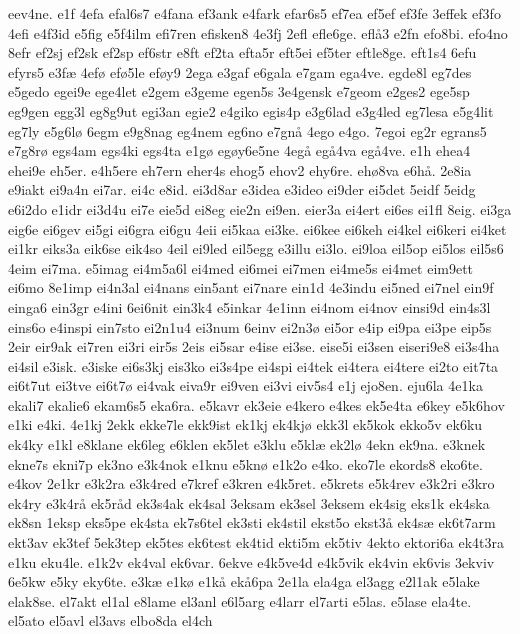 eev4ne.
e1f
4efa
efal6s7
e4fana
ef3ank
e4fark
efar6s5
ef7ea
ef5ef
ef3fe
3effek
ef3fo
4efi
e4f3id
e5fig
e5f4ilm
efi7ren
efisken8
4e3fj
2efl
efle6ge.
efl^^e53
e2fn
efo8bi.
efo4no
8efr
ef2sj
ef2sk
ef2sp
ef6str
e8ft
ef2ta
efta5r
eft5ei
ef5ter
eftle8ge.
eft1s4
6efu
efyrs5
e3f^^e6
4ef^^f8
ef^^f85le
ef^^f8y9
2ega
e3gaf
e6gala
e7gam
ega4ve.
egde8l
eg7des
e5gedo
egei9e
ege4let
e2gem
e3geme
egen5s
3e4gensk
e7geom
e2ges2
ege5sp
eg9gen
egg3l
eg8g9ut
egi3an
egie2
e4giko
egis4p
e3g6lad
e3g4led
eg7lesa
e5g4lit
eg7ly
e5g6l^^f8
6egm
e9g8nag
eg4nem
eg6no
e7gn^^e5
4ego
e4go.
7egoi
eg2r
egrans5
e7g8r^^f8
egs4am
egs4ki
egs4ta
e1g^^f8
eg^^f8y6e5ne
4eg^^e5
eg^^e54va
eg^^e54ve.
e1h
ehea4
ehei9e
eh5er.
e4h5ere
eh7ern
eher4s
ehog5
ehov2
ehy6re.
eh^^f88va
e6h^^e5.
2e8ia
e9iakt
ei9a4n
ei7ar.
ei4c
e8id.
ei3d8ar
e3idea
e3ideo
ei9der
ei5det
5eidf
5eidg
e6i2do
e1idr
ei3d4u
ei7e
eie5d
ei8eg
eie2n
ei9en.
eier3a
ei4ert
ei6es
ei1fl
8eig.
ei3ga
eig6e
ei6gev
ei5gi
ei6gra
ei6gu
4eii
ei5kaa
ei3ke.
ei6kee
ei6keh
ei4kel
ei6keri
ei4ket
ei1kr
eiks3a
eik6se
eik4so
4eil
ei9led
eil5egg
e3illu
ei3lo.
ei9loa
eil5op
ei5los
eil5s6
4eim
ei7ma.
e5imag
ei4m5a6l
ei4med
ei6mei
ei7men
ei4me5s
ei4met
eim9ett
ei6mo
8e1imp
ei4n3al
ei4nans
ein5ant
ei7nare
ein1d
4e3indu
ei5ned
ei7nel
ein9f
einga6
ein3gr
e4ini
6ei6nit
ein3k4
e5inkar
4e1inn
ei4nom
ei4nov
einsi9d
ein4s3l
eins6o
e4inspi
ein7sto
ei2n1u4
ei3num
6einv
ei2n3^^f8
ei5or
e4ip
ei9pa
ei3pe
eip5s
2eir
eir9ak
ei7ren
ei3ri
eir5s
2eis
ei5sar
e4ise
ei3se.
eise5i
ei3sen
eiseri9e8
ei3s4ha
ei4sil
e3isk.
e3iske
ei6s3kj
eis3ko
ei3s4pe
ei4spi
ei4tek
ei4tera
ei4tere
ei2to
eit7ta
ei6t7ut
ei3tve
ei6t7^^f8
ei4vak
eiva9r
ei9ven
ei3vi
eiv5s4
e1j
ejo8en.
eju6la
4e1ka
ekali7
ekalie6
ekam6s5
eka6ra.
e5kavr
ek3eie
e4kero
e4kes
ek5e4ta
e6key
e5k6hov
e1ki
e4ki.
4e1kj
2ekk
ekke7le
ekk9ist
ek1kj
ek4kj^^f8
ekk3l
ek5kok
ekko5v
ek6ku
ek4ky
e1kl
e8klane
ek6leg
e6klen
ek5let
e3klu
e5kl^^e6
ek2l^^f8
4ekn
ek9na.
e3knek
ekne7s
ekni7p
ek3no
e3k4nok
e1knu
e5kn^^f8
e1k2o
e4ko.
eko7le
ekords8
eko6te.
e4kov
2e1kr
e3k2ra
e3k4red
e7kref
e3kren
e4k5ret.
e5krets
e5k4rev
e3k2ri
e3kro
ek4ry
e3k4r^^e5
ek5r^^e5d
ek3s4ak
ek4sal
3eksam
ek3sel
3eksem
ek4sig
eks1k
ek4ska
ek8sn
1eksp
eks5pe
ek4sta
ek7s6tel
ek3sti
ek4stil
ekst5o
ekst3^^e5
ek4s^^e6
ek6t7arm
ekt3av
ek3tef
5ek3tep
ek5tes
ek6test
ek4tid
ekti5m
ek5tiv
4ekto
ektori6a
ek4t3ra
e1ku
eku4le.
e1k2v
ek4val
ek6var.
6ekve
e4k5ve4d
e4k5vik
ek4vin
ek6vis
3ekviv
6e5kw
e5ky
eky6te.
e3k^^e6
e1k^^f8
e1k^^e5
ek^^e56pa
2e1la
ela4ga
el3agg
e2l1ak
e5lake
elak8se.
el7akt
el1al
e8lame
el3anl
e6l5arg
e4larr
el7arti
e5las.
e5lase
ela4te.
el5ato
el5avl
el3avs
elbo8da
el4ch
